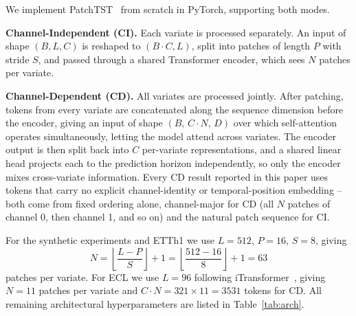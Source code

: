 \documentclass[10pt]{article} %
\begin{document}
    We implement PatchTST~\citep{nie2023patchtst} from scratch in PyTorch, supporting both modes.

    \textbf{Channel-Independent (CI).} Each variate is processed separately. An input of shape $(B, L, C)$ is reshaped to
    $(B \cdot C, L)$, split into patches of length $P$ with stride $S$, and passed through a shared Transformer encoder,
    which sees $N$ patches per variate.

    \textbf{Channel-Dependent (CD).} All variates are processed jointly. After patching, tokens from every variate are
    concatenated along the sequence dimension before the encoder, giving an input of shape $(B,\, C \cdot N,\, D)$ over which
    self-attention operates simultaneously, letting the model attend across variates. The encoder output is then split back
    into $C$ per-variate representations, and a shared linear head projects each to the prediction horizon independently, so
    only the encoder mixes cross-variate information. Every CD result reported in this paper uses tokens that carry no explicit
    channel-identity or temporal-position embedding -- both come from fixed ordering alone, channel-major for CD (all $N$
    patches of channel 0, then channel 1, and so on) and the natural patch sequence for CI.

    For the synthetic experiments and ETTh1 we use $L = 512$, $P = 16$, $S = 8$, giving
    \begin{equation}
        N = \left\lfloor \frac{L - P}{S} \right\rfloor + 1
        = \left\lfloor \frac{512 - 16}{8} \right\rfloor + 1 = 63
    \end{equation}
    patches per variate. For ECL we use $L = 96$ following iTransformer~\citep{liu2024itransformer}, giving $N = 11$ patches
    per variate and $C \cdot N = 321 \times 11 = 3531$ tokens for CD. All remaining architectural hyperparameters are listed
    in Table~\ref{tab:arch}.
\end{document}
